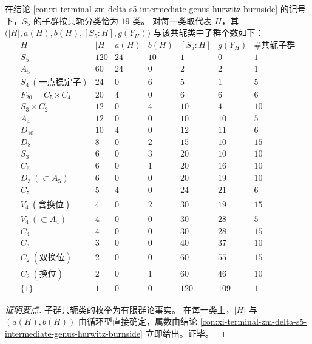 \begin{conclusion}\label{con:xi-terminal-zm-delta-s5-intermediate-genus-spectrum-19}
在结论 \ref{con:xi-terminal-zm-delta-s5-intermediate-genus-hurwitz-burnside} 的记号下，\(S_5\) 的子群按共轭分类恰为 \(19\) 类。
对每一类取代表 \(H\)，其 \(\bigl(|H|,a(H),b(H),[S_5\!:\!H],g(Y_H)\bigr)\) 与该共轭类中子群个数如下：
\[
\begin{array}{c|c|c|c|c|c|c}
H & |H| & a(H) & b(H) & [S_5\!:\!H] & g(Y_H) & \#\text{共轭子群}\\
\hline
S_5 & 120 & 24 & 10 & 1 & 0 & 1\\
A_5 & 60 & 24 & 0 & 2 & 2 & 1\\
S_4\ (\text{一点稳定子}) & 24 & 0 & 6 & 5 & 1 & 5\\
F_{20}=C_5\rtimes C_4 & 20 & 4 & 0 & 6 & 6 & 6\\
S_3\times C_2 & 12 & 0 & 4 & 10 & 4 & 10\\
A_4 & 12 & 0 & 0 & 10 & 10 & 5\\
D_{10} & 10 & 4 & 0 & 12 & 11 & 6\\
D_{8} & 8 & 0 & 2 & 15 & 10 & 15\\
S_3 & 6 & 0 & 3 & 20 & 10 & 10\\
C_6 & 6 & 0 & 1 & 20 & 16 & 10\\
D_3\ (\subset A_5) & 6 & 0 & 0 & 20 & 19 & 10\\
C_5 & 5 & 4 & 0 & 24 & 21 & 6\\
V_4\ (\text{含换位}) & 4 & 0 & 2 & 30 & 19 & 15\\
V_4\ (\subset A_4) & 4 & 0 & 0 & 30 & 28 & 5\\
C_4 & 4 & 0 & 0 & 30 & 28 & 15\\
C_3 & 3 & 0 & 0 & 40 & 37 & 10\\
C_2\ (\text{双换位}) & 2 & 0 & 0 & 60 & 55 & 15\\
C_2\ (\text{换位}) & 2 & 0 & 1 & 60 & 46 & 10\\
\{1\} & 1 & 0 & 0 & 120 & 109 & 1
\end{array}
\]
\end{conclusion}
\begin{proof}[证明要点]
子群共轭类的枚举为有限群论事实。
在每一类上，\(|H|\) 与 \((a(H),b(H))\) 由循环型直接确定，属数由结论 \ref{con:xi-terminal-zm-delta-s5-intermediate-genus-hurwitz-burnside} 立即给出。证毕。
\end{proof}

